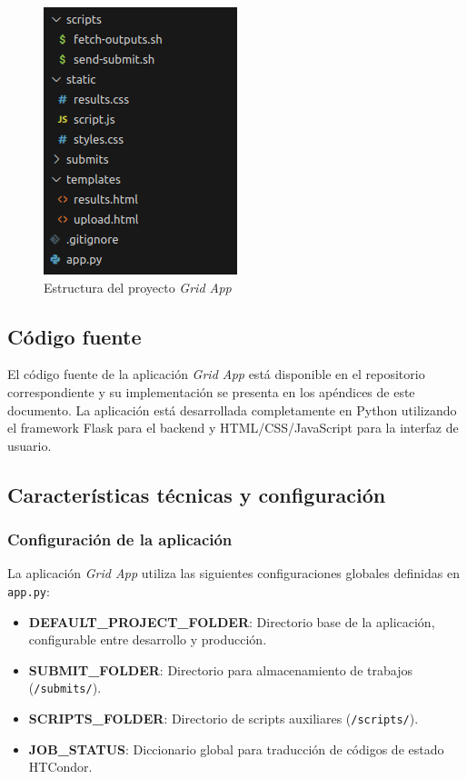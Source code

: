 \begin{figure}[H]
	\centering
	\includegraphics[scale=0.7]{tablas-images/pmv/estructura-proyecto-grid-app.png}
	\caption{Estructura del proyecto \textit{Grid App}}
	\label{fig:estructura-proyecto-grid-app}
\end{figure}

\subsection{Código fuente}
\noindent

El código fuente de la aplicación \textit{Grid App} está disponible en el repositorio correspondiente y su implementación se presenta en los apéndices de este documento. La aplicación está desarrollada completamente en Python utilizando el framework Flask para el backend y HTML/CSS/JavaScript para la interfaz de usuario.

\subsection{Características técnicas y configuración}
\noindent

\subsubsection{Configuración de la aplicación}
\noindent

La aplicación \textit{Grid App} utiliza las siguientes configuraciones globales definidas en \texttt{app.py}:

\begin{itemize}
	\item \textbf{DEFAULT\_PROJECT\_FOLDER}: Directorio base de la aplicación, configurable entre desarrollo y producción.
	\item \textbf{SUBMIT\_FOLDER}: Directorio para almacenamiento de trabajos (\texttt{/submits/}).
	\item \textbf{SCRIPTS\_FOLDER}: Directorio de scripts auxiliares (\texttt{/scripts/}).
	\item \textbf{JOB\_STATUS}: Diccionario global para traducción de códigos de estado HTCondor.
\end{itemize}


